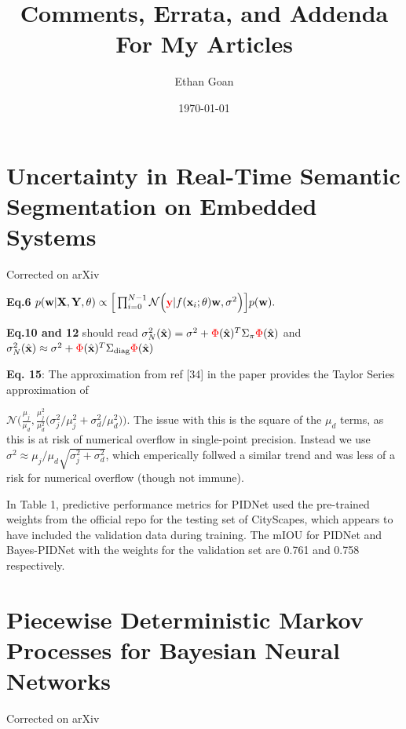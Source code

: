 \documentclass{article}
\title{{\titlefont Comments, Errata, and Addenda For My Articles}}
\author{{\authorfont Ethan Goan}}
\date{\small \today}
\begin{document}
\maketitle
\tableofcontents


\section{Uncertainty in Real-Time Semantic Segmentation on Embedded Systems}
Corrected on arXiv

\textbf{Eq.6}  $ p(\mathbf{w} | \mathbf{X}, \mathbf{Y} , \theta ) \propto \Big[\prod_{i=0}^{N-1}\mathcal{N}\Big({\color{red}\mathbf{y}}|f(\mathbf{x}_{i};\theta) \mathbf{w}, \sigma^{2}\Big)\Big] p(\mathbf{w}).$

\textbf{Eq.10 and 12} should read $\sigma^{2}_{N}(\hat{\mathbf{x}}) =
\sigma^{2} + {\color{red} \Phi}(\hat{\mathbf{x}})^{T}\Sigma_{\pi}{\color{red} \Phi}(\hat{\mathbf{x}})$ and
$\sigma^{2}_{N}(\hat{\mathbf{x}}) \approx \sigma^{2} +
{\color{red}\Phi}(\hat{\mathbf{x}})^{T}\Sigma_{\text{diag}}{\color{red}\Phi}(\hat{\mathbf{x}})$

\textbf{Eq. 15}: The approximation from ref [34] in the paper provides the Taylor Series approximation of

$ \mathcal{N}\Big(\frac{\mu_{j}}{\mu_{d}},\frac{\mu_{j}^{2}}{\mu_{d}^{2}}\big(\sigma^{2}_{j} / \mu_{j}^{2} +  \sigma^{2}_{d} / \mu_{d}^{2} \big)\Big)$. The issue with this is the square of the $\mu_{d}$ terms, as this is at risk of numerical overflow in single-point precision. Instead we use $\sigma^{2} \approx \mu_{j} / \mu_{d}\sqrt{\sigma^{2}_{j} + \sigma^{2}_{d}}$, which emperically follwed a similar trend and was less of a risk for numerical overflow (though not immune).

In Table 1, predictive performance metrics for PIDNet used the pre-trained weights from the official repo for the testing set of CityScapes, which appears to have included the validation data during training. The mIOU for PIDNet and Bayes-PIDNet with the weights for the validation set are 0.761 and 0.758 respectively.

\section{Piecewise Deterministic Markov Processes for Bayesian Neural Networks}
Corrected on arXiv
\end{document}

